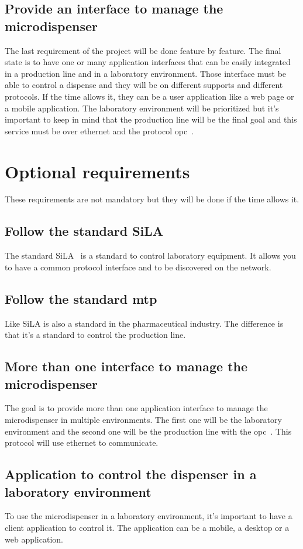 \subsection{Provide an interface to manage the microdispenser}\label{subsec:goals-interface}
The last requirement of the project will be done feature by feature.
The final state is to have one or many application interfaces that can be easily integrated in a production line and in a laboratory environment.
Those interface must be able to control a dispense and they will be on different supports and different protocols.
If the time allows it, they can be a user application like a web page or a mobile application.
The laboratory environment will be prioritized but it's important to keep in mind that the production line will be the final goal and this service must be over ethernet and the protocol \acrfull{opc}~\cite{opc}.



\section{Optional requirements}\label{sec:goals:optional}
These requirements are not mandatory but they will be done if the time allows it.

\subsection{Follow the standard SiLA}\label{subsec:sila}
The standard SiLA~\cite{sila} is a standard to control laboratory equipment.
It allows you to have a common protocol interface and to be discovered on the network.

\subsection{Follow the standard \acrlong{mtp}}\label{subsec:mtp}
Like SiLA is also a standard in the pharmaceutical industry.
The difference is that it's a standard to control the production line.

\subsection{More than one interface to manage the microdispenser}\label{subsec:moreinterface}
The goal is to provide more than one application interface to manage the microdispenser in multiple environments.
The first one will be the laboratory environment and the second one will be the production line with the \acrshort{opc}~\cite{opc}.
This protocol will use ethernet to communicate.

\subsection{Application to control the dispenser in a laboratory environment}\label{subsec:mobile}
To use the microdispenser in a laboratory environment, it's important to have a client application to control it.
The application can be a mobile, a desktop or a web application.
